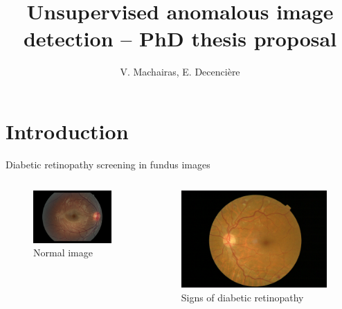 \documentclass[xcolor=pdftex,dvipsnames,table,mathserif]{beamer}
\title{Unsupervised anomalous image detection -- PhD thesis proposal}
\author{V. Machairas, E. Decencière}
\date{Capgemini Invent\\
  Mines Paris - PSL

}
\begin{document}
\frame{\titlepage}


\section{Introduction}

\begin{frame}{Diabetic retinopathy screening in fundus images}

  \begin{columns}
    \begin{column}{.5\textwidth}
  \begin{figure}[ht]
    \centering
    \includegraphics[width=\textwidth]{fundus1}
    \caption*{Normal image}
  \end{figure}

    \end{column}

    \begin{column}{.5\textwidth}

\begin{figure}[ht]
  \centering
  \includegraphics[width=\textwidth]{ret-dr}
  \caption*{Signs of diabetic retinopathy}
\end{figure}



\end{column}
\end{columns}
\end{frame}
\end{document}
